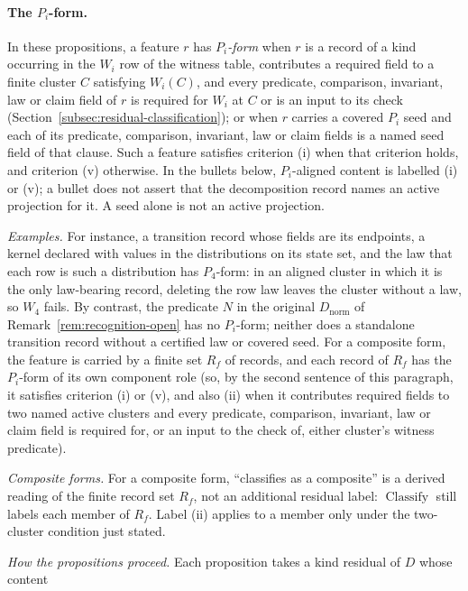 \documentclass[11pt]{article}
\theoremstyle{definition}
\begin{document}
\paragraph{The \(P_i\)-form.}\label{par:pi-form} In these propositions, a feature \(r\) has \emph{\(P_i\)-form} when \(r\) is a
record of a kind occurring in the \(W_i\) row of the witness table,
contributes a required field to a finite cluster \(C\) satisfying \(W_i(C)\),
and every predicate, comparison, invariant, law or claim field of \(r\) is
required for \(W_i\) at \(C\) or is an input to its check
(Section~\ref{subsec:residual-classification}); or when \(r\) carries a covered
\(P_i\) seed and each of its predicate, comparison, invariant, law or claim fields is a named seed field of that clause. Such
a feature satisfies criterion (i) when that criterion holds, and criterion (v)
otherwise. In the bullets below, \(P_i\)-aligned content is
labelled (i) or (v); a bullet does not assert that the decomposition record
names an active projection for it. A seed alone is not an active projection.
\par\emph{Examples.} For instance, a transition record whose fields are its endpoints, a kernel
declared with values in the distributions on its state set, and the law that
each row is such a distribution has \(P_4\)-form: in an aligned cluster in which it is the only law-bearing
record, deleting the row law leaves the cluster without a law, so \(W_4\)
fails. By contrast, the predicate \(N\) in the original \(D_{\mathrm{norm}}\) of
Remark~\ref{rem:recognition-open} has no \(P_i\)-form; neither does a
standalone transition record without a certified law or covered seed. For a
composite form, the feature is carried by a finite set \(R_f\) of records, and
each record of \(R_f\) has the \(P_i\)-form of its own component role (so, by
the second sentence of this paragraph, it satisfies criterion (i) or (v), and
also (ii) when it contributes required fields to two named active clusters and every
predicate, comparison, invariant, law or claim field is required for, or an
input to the check of, either cluster's witness predicate).
\par\emph{Composite forms.} For a composite form, ``classifies as a composite'' is a derived
reading of the finite record set \(R_f\), not an additional residual
label: \(\operatorname{Classify}\) still labels each member of \(R_f\).
Label (ii) applies to a member only under the two-cluster condition just
stated.
\par\emph{How the propositions proceed.} Each proposition takes a kind residual of \(D\) whose content
\end{document}
